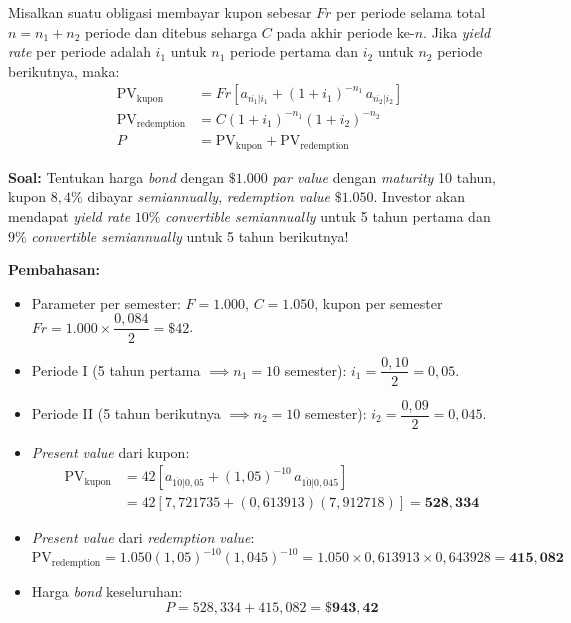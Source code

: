 \documentclass[11pt,a4paper]{article}
\begin{document}
\begin{theorembox}
Misalkan suatu obligasi membayar kupon sebesar $Fr$ per periode selama total $n = n_1 + n_2$ periode dan ditebus seharga $C$ pada akhir periode ke-$n$. Jika \textit{yield rate} per periode adalah $i_1$ untuk $n_1$ periode pertama dan $i_2$ untuk $n_2$ periode berikutnya, maka:
\begin{align}
    \text{PV}_{\text{kupon}} &= Fr\left[a_{\overline{n_1}|i_1} + (1 + i_1)^{-n_1} \, a_{\overline{n_2}|i_2}\right] \\
    \text{PV}_{\text{redemption}} &= C(1 + i_1)^{-n_1}(1 + i_2)^{-n_2} \\
    P &= \text{PV}_{\text{kupon}} + \text{PV}_{\text{redemption}}
\end{align}
\end{theorembox}

\begin{examplebox}
\textbf{Soal:} Tentukan harga \textit{bond} dengan $\$1.000$ \textit{par value} dengan \textit{maturity} 10 tahun, kupon $8{,}4\%$ dibayar \textit{semiannually}, \textit{redemption value} $\$1.050$. Investor akan mendapat \textit{yield rate} $10\%$ \textit{convertible semiannually} untuk 5 tahun pertama dan $9\%$ \textit{convertible semiannually} untuk 5 tahun berikutnya!

\tcblower
\textbf{Pembahasan:}
\begin{itemize}[topsep=2pt, itemsep=2pt]
    \item Parameter per semester: $F = 1.000$, $C = 1.050$, kupon per semester $Fr = 1.000 \times \dfrac{0{,}084}{2} = \$42$.
    \item Periode I (5 tahun pertama $\implies n_1 = 10$ semester): $i_1 = \dfrac{0{,}10}{2} = 0{,}05$.
    \item Periode II (5 tahun berikutnya $\implies n_2 = 10$ semester): $i_2 = \dfrac{0{,}09}{2} = 0{,}045$.
    \item \textit{Present value} dari kupon:
    \begin{align*}
        \text{PV}_{\text{kupon}} &= 42\left[a_{\overline{10}|0{,}05} + (1{,}05)^{-10} \, a_{\overline{10}|0{,}045}\right] \\
        &= 42\left[7{,}721735 + (0{,}613913)(7{,}912718)\right] = \mathbf{528{,}334}
    \end{align*}
    \item \textit{Present value} dari \textit{redemption value}:
    \[
        \text{PV}_{\text{redemption}} = 1.050(1{,}05)^{-10}(1{,}045)^{-10} = 1.050 \times 0{,}613913 \times 0{,}643928 = \mathbf{415{,}082}
    \]
    \item Harga \textit{bond} keseluruhan:
    \[
        P = 528{,}334 + 415{,}082 = \mathbf{\$943{,}42}
    \]
\end{itemize}
\end{examplebox}
\end{document}

